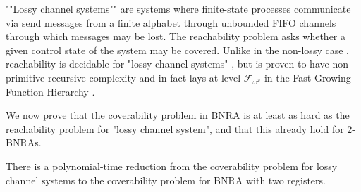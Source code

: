 






""Lossy channel systems""  are systems where finite-state processes communicate via send messages from a finite alphabet through unbounded FIFO channels through which messages may be lost. The reachability problem asks whether a given control state of the system may be covered. Unlike in the non-lossy case \cite{BZ83}, reachability is decidable for "lossy channel systems" \cite{AK95,AbdullaJ1996undec}, but is proven to have non-primitive recursive complexity \cite{Schnoebelen2002verifying} and in fact lays at level $\mathcal{F}_{\omega^{\omega}}$ in the Fast-Growing Function Hierarchy \cite{ChambartS2008ordinal}.

We now prove that the coverability problem in BNRA is at least as hard as the reachability problem for "lossy channel system", and that this already hold for $2$-BNRAs.  
\begin{proposition}
	\label{prop:reduction-LCS}
	There is a polynomial-time reduction from the coverability problem for lossy channel systems to the coverability problem for BNRA with two registers.
\end{proposition}

